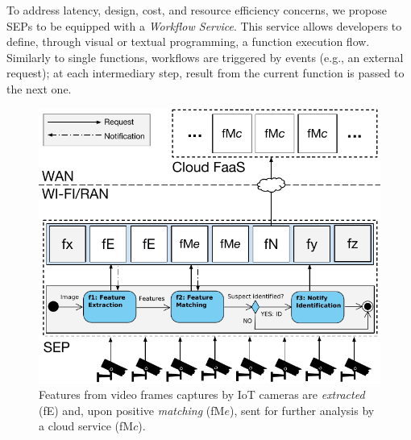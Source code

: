 To address latency, design, cost, and resource efficiency concerns, we propose SEPs to be equipped with a \textit{Workflow Service}. This service allows developers to define, through visual or textual programming, a function execution flow.
Similarly to single functions, workflows are triggered by events (e.g., an external request); at each intermediary step, result from the current function is passed to the next one. 

\begin{figure}[bp]
	\centering
	\includegraphics[width=0.95\linewidth]{Figs/Edge_Data_Analytics_Video_Surveillance.pdf}
	\caption{Features from video frames captures by IoT cameras are \textit{extracted} (fE) and, upon positive \textit{matching} (fM$e$), sent for further analysis by a cloud service (fM$c$).}
	\label{fig:Edge_Data_Analytics_Video_Surveillance}
\end{figure}

